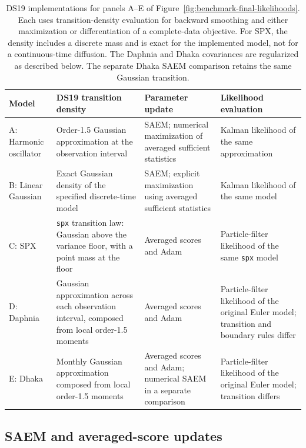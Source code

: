 \documentclass[11pt]{article}
\theoremstyle{thmstylethree}%
\begin{document}
\begin{table}[htbp]
\centering
\small
\setlength{\tabcolsep}{4pt}
\renewcommand{\arraystretch}{1.15}
\begin{tabular}{@{}>{\raggedright\arraybackslash}p{}
>{\raggedright\arraybackslash}p{}
>{\raggedright\arraybackslash}p{}
>{\raggedright\arraybackslash}p{}@{}}
\toprule
Model & DS19 transition density & Parameter update & Likelihood evaluation \\
\midrule
A: Harmonic oscillator
& Order-1.5 Gaussian approximation at the observation interval
& SAEM; numerical maximization of averaged sufficient statistics
& Kalman likelihood of the same approximation \\
\addlinespace
B: Linear Gaussian
& Exact Gaussian density of the specified discrete-time model
& SAEM; explicit maximization using averaged sufficient statistics
& Kalman likelihood of the same model \\
\addlinespace
C: SPX
& \texttt{spx} transition law: Gaussian above the variance floor, with a point mass at the floor
& Averaged scores and Adam
& Particle-filter likelihood of the same \texttt{spx} model \\
\addlinespace
D: Daphnia
& Gaussian approximation across each observation interval, composed from local order-1.5 moments
& Averaged scores and Adam
& Particle-filter likelihood of the original Euler model; transition and boundary rules differ \\
\addlinespace
E: Dhaka
& Monthly Gaussian approximation composed from local order-1.5 moments
& Averaged scores and Adam; numerical SAEM in a separate comparison
& Particle-filter likelihood of the original Euler model; transition differs \\
\bottomrule
\end{tabular}
\caption{DS19 implementations for panels A--E of
Figure~\ref{fig:benchmark-final-likelihoods}.
Each uses transition-density evaluation for backward smoothing and either
maximization or differentiation of a complete-data objective.
For SPX, the density includes a discrete mass and is exact for the
implemented model, not for a continuous-time diffusion.
The Daphnia and Dhaka covariances are regularized as described below.
The separate Dhaka SAEM comparison retains the same Gaussian transition.}
\label{tab:ds19-models}
\end{table}

\subsection{SAEM and averaged-score updates}
\label{sec:ds19-update-equations}
\end{document}
